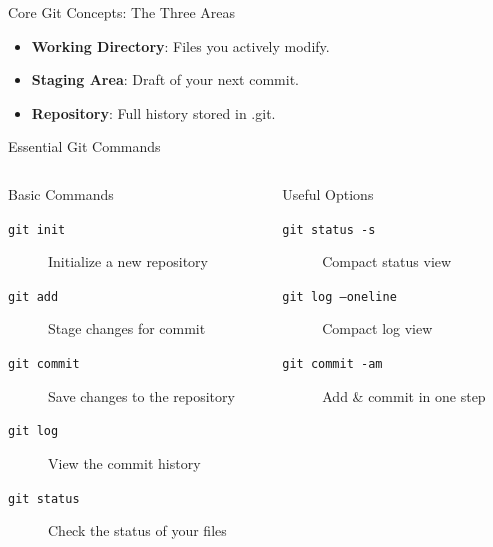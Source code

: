 \documentclass[aspectratio=169]{beamer}
\begin{document}
\begin{frame}{Core Git Concepts: The Three Areas}
  \centering
  \begin{itemize}
      \item \textbf{Working Directory}: Files you actively modify.
      \item \textbf{Staging Area}: Draft of your next commit.
      \item \textbf{Repository}: Full history stored in .git.
  \end{itemize}
\end{frame}

\begin{frame}{Essential Git Commands}
  \begin{columns}
    \begin{column}{0.48\textwidth}
      \begin{block}{Basic Commands}
        \begin{description}
          \item[\texttt{git init}] Initialize a new repository
          \item[\texttt{git add}] Stage changes for commit
          \item[\texttt{git commit}] Save changes to the repository
          \item[\texttt{git log}] View the commit history
          \item[\texttt{git status}] Check the status of your files
        \end{description}
      \end{block}
    \end{column}
    \begin{column}{0.48\textwidth}
      \begin{block}{Useful Options}
        \begin{description}
          \item[\texttt{git status -s}] Compact status view
          \item[\texttt{git log --oneline}] Compact log view
          \item[\texttt{git commit -am}] Add \& commit in one step
        \end{description}
      \end{block}
    \end{column}
  \end{columns}
\end{frame}
\end{document}
